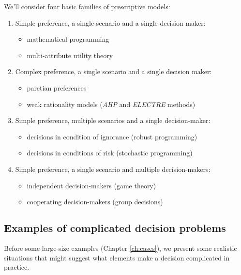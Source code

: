 We'll consider four basic families of prescriptive models: 
\begin{enumerate}
	\item Simple preference, a single scenario and a single decision maker:
	\begin{itemize}
		\item mathematical programming
		
		\item multi-attribute utility theory
	\end{itemize}
	
	\item Complex preference, a single scenario and a single decision maker:
	\begin{itemize}
		\item paretian preferences
		
		\item weak rationality models (\textit{AHP} and \textit{ELECTRE} methods)
	\end{itemize}
	
	\item Simple preference, multiple scenarios and a single decision-maker:
	\begin{itemize}
		\item decisions in condition of ignorance (robust programming)
		
		\item decisions in conditions of risk (stochastic programming)
	\end{itemize}
	
	\item Simple preference, a single scenario and multiple decision-makers: 
	\begin{itemize}
		\item independent decision-makers (game theory)
		
		\item cooperating decision-makers (group decisions)
	\end{itemize}
\end{enumerate}

\subsection{Examples of complicated decision problems}
\label{subsec:examplesofcomplicatedproblems}

Before some large-size examples (Chapter \ref{ch:cases}), we present some realistic situations that might suggest what elements make a decision complicated in practice.


